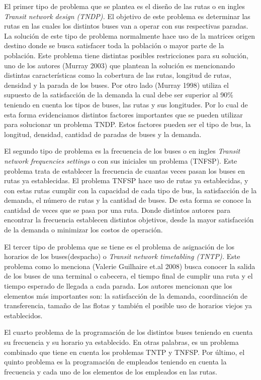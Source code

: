 \documentclass[preprint,11pt]{elsarticle}
\begin{document}
El primer tipo de problema que se plantea es el diseño de las rutas o en ingles \textit{Transit network design (TNDP). }El objetivo de este problema es determinar las rutas en las cuales los distintos buses van a operar con sus respectivas paradas. La solución de este tipo de problema normalmente hace uso de la matrices origen destino donde se busca satisfacer toda la población o mayor parte de la población. Este problema tiene distintas posibles restricciones para su solución, uno de los autores (Murray 2003) \cite{murray2003}  que plantean la solución es mencionando distintas características como la cobertura de las rutas, longitud de rutas, densidad y la parada de los buses. Por otro lado (Murray 1998)  \cite{murray1998} utiliza el supuesto de la satisfacción de la demanda la cual debe ser superior al 90\% teniendo en cuenta los tipos de buses, las rutas y sus longitudes. Por lo cual de esta forma evidenciamos distintos factores importantes que se pueden utilizar para solucionar un problema TNDP. Estos factores pueden ser el tipo de bus, la longitud, densidad, cantidad de paradas de buses y la demanda. 

El segundo tipo de problema es la frecuencia de los buses o en ingles \textit{Transit network frequencies settings} o con sus iniciales un problema (TNFSP). Este problema trata de establecer la frecuencia de cuantas veces pasan los buses en rutas ya establecidas. El problema TNFSP hace uso de rutas ya establecidas, y con estas rutas cumplir con la capacidad de cada tipo de bus, la satisfacción de la demanda, el número de rutas y la cantidad de buses. De esta forma se conoce la cantidad de veces que se pasa por una ruta. Donde distintos autores para encontrar la frecuencia establecen distintos objetivos, desde la mayor satisfacción de la demanda o minimizar los costos de operación. 

El tercer tipo de problema que se tiene es el problema de asignación de los horarios de los buses(despacho) o \textit{Transit network timetabling (TNTP). }Este problema como lo menciona (Valerie Guilhaire et.al 2008) \cite{guihaire2008} busca conocer la salida de los buses de una terminal o cabecera, el tiempo final de cumplir una ruta y el tiempo esperado de llegada a cada parada. Los autores mencionan que los elementos más importantes son: la satisfacción de la demanda, coordinación de transferencia, tamaño de las flotas y también el posible uso de horarios viejos ya establecidos.

El cuarto problema de la programación de los distintos buses teniendo en cuenta su frecuencia y su horario ya establecido. En otras palabras, es un problema combinado que tiene en cuenta los problemas TNTP y TNFSP. Por último, el quinto problema es la programación de empleados teniendo en cuenta la frecuencia y cada uno de los elementos de los empleados en las rutas. 
\end{document}
